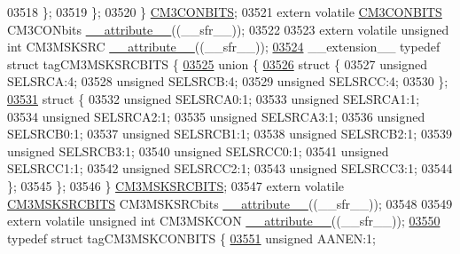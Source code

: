 \begin{DoxyCode}
03518     \};
03519   \};
03520 \} \hyperlink{a00009_de/dab/a00319}{CM3CONBITS};
03521 \textcolor{keyword}{extern} \textcolor{keyword}{volatile} \hyperlink{a00009_de/dab/a00319}{CM3CONBITS} CM3CONbits \hyperlink{a00009_a493c46f03454991ccc5aa7a6e1dfb2a7}{\_\_attribute\_\_}((\_\_sfr\_\_));
03522 
03523 \textcolor{keyword}{extern} \textcolor{keyword}{volatile} \textcolor{keywordtype}{unsigned} \textcolor{keywordtype}{int}  CM3MSKSRC \hyperlink{a00009_a493c46f03454991ccc5aa7a6e1dfb2a7}{\_\_attribute\_\_}((\_\_sfr\_\_));
\hypertarget{a00009_source_l03524}{}\hyperlink{a00009}{03524} \_\_extension\_\_ \textcolor{keyword}{typedef} \textcolor{keyword}{struct }tagCM3MSKSRCBITS \{
\hypertarget{a00009_source_l03525}{}\hyperlink{a00009}{03525}   \textcolor{keyword}{union }\{
\hypertarget{a00009_source_l03526}{}\hyperlink{a00009}{03526}     \textcolor{keyword}{struct }\{
03527       \textcolor{keywordtype}{unsigned} SELSRCA:4;
03528       \textcolor{keywordtype}{unsigned} SELSRCB:4;
03529       \textcolor{keywordtype}{unsigned} SELSRCC:4;
03530     \};
\hypertarget{a00009_source_l03531}{}\hyperlink{a00009}{03531}     \textcolor{keyword}{struct }\{
03532       \textcolor{keywordtype}{unsigned} SELSRCA0:1;
03533       \textcolor{keywordtype}{unsigned} SELSRCA1:1;
03534       \textcolor{keywordtype}{unsigned} SELSRCA2:1;
03535       \textcolor{keywordtype}{unsigned} SELSRCA3:1;
03536       \textcolor{keywordtype}{unsigned} SELSRCB0:1;
03537       \textcolor{keywordtype}{unsigned} SELSRCB1:1;
03538       \textcolor{keywordtype}{unsigned} SELSRCB2:1;
03539       \textcolor{keywordtype}{unsigned} SELSRCB3:1;
03540       \textcolor{keywordtype}{unsigned} SELSRCC0:1;
03541       \textcolor{keywordtype}{unsigned} SELSRCC1:1;
03542       \textcolor{keywordtype}{unsigned} SELSRCC2:1;
03543       \textcolor{keywordtype}{unsigned} SELSRCC3:1;
03544     \};
03545   \};
03546 \} \hyperlink{a00009_d8/d23/a00326}{CM3MSKSRCBITS};
03547 \textcolor{keyword}{extern} \textcolor{keyword}{volatile} \hyperlink{a00009_d8/d23/a00326}{CM3MSKSRCBITS} CM3MSKSRCbits \hyperlink{a00009_a493c46f03454991ccc5aa7a6e1dfb2a7}{\_\_attribute\_\_}((\_\_sfr\_\_));
03548 
03549 \textcolor{keyword}{extern} \textcolor{keyword}{volatile} \textcolor{keywordtype}{unsigned} \textcolor{keywordtype}{int}  CM3MSKCON \hyperlink{a00009_a493c46f03454991ccc5aa7a6e1dfb2a7}{\_\_attribute\_\_}((\_\_sfr\_\_));
\hypertarget{a00009_source_l03550}{}\hyperlink{a00009}{03550} \textcolor{keyword}{typedef} \textcolor{keyword}{struct }tagCM3MSKCONBITS \{
\hypertarget{a00009_source_l03551}{}\hyperlink{a00009_a6ea89b9cbdf0bbde3ec8147513e70fa0}{03551}   \textcolor{keywordtype}{unsigned} AANEN:1;

\end{DoxyCode}
